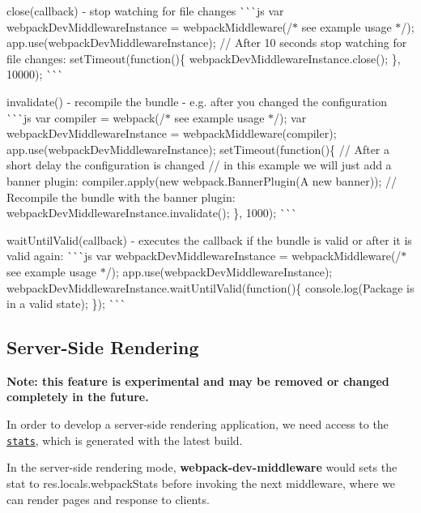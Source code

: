 \begin{DoxyItemize}
\item {\ttfamily close(callback)} -\/ stop watching for file changes \`{}\`{}\`{}js var webpack\+Dev\+Middleware\+Instance = webpack\+Middleware(/$\ast$ see example usage $\ast$/); app.\+use(webpack\+Dev\+Middleware\+Instance); // After 10 seconds stop watching for file changes\+: set\+Timeout(function()\{ webpack\+Dev\+Middleware\+Instance.\+close(); \}, 10000); \`{}\`{}\`{}
\item {\ttfamily invalidate()} -\/ recompile the bundle -\/ e.\+g. after you changed the configuration \`{}\`{}\`{}js var compiler = webpack(/$\ast$ see example usage $\ast$/); var webpack\+Dev\+Middleware\+Instance = webpack\+Middleware(compiler); app.\+use(webpack\+Dev\+Middleware\+Instance); set\+Timeout(function()\{ // After a short delay the configuration is changed // in this example we will just add a banner plugin\+: compiler.\+apply(new webpack.\+Banner\+Plugin(\textquotesingle{}A new banner\textquotesingle{})); // Recompile the bundle with the banner plugin\+: webpack\+Dev\+Middleware\+Instance.\+invalidate(); \}, 1000); \`{}\`{}\`{}
\item {\ttfamily wait\+Until\+Valid(callback)} -\/ executes the {\ttfamily callback} if the bundle is valid or after it is valid again\+: \`{}\`{}\`{}js var webpack\+Dev\+Middleware\+Instance = webpack\+Middleware(/$\ast$ see example usage $\ast$/); app.\+use(webpack\+Dev\+Middleware\+Instance); webpack\+Dev\+Middleware\+Instance.\+wait\+Until\+Valid(function()\{ console.\+log(\textquotesingle{}Package is in a valid state\textquotesingle{}); \}); \`{}\`{}\`{}
\end{DoxyItemize}

\subsection*{Server-\/\+Side Rendering}

{\bfseries Note\+: this feature is experimental and may be removed or changed completely in the future.}

In order to develop a server-\/side rendering application, we need access to the \href{https://github.com/webpack/docs/wiki/node.js-api#stats}{\tt {\ttfamily stats}}, which is generated with the latest build.

In the server-\/side rendering mode, {\bfseries webpack-\/dev-\/middleware} would sets the {\ttfamily stat} to {\ttfamily res.\+locals.\+webpack\+Stats} before invoking the next middleware, where we can render pages and response to clients.

